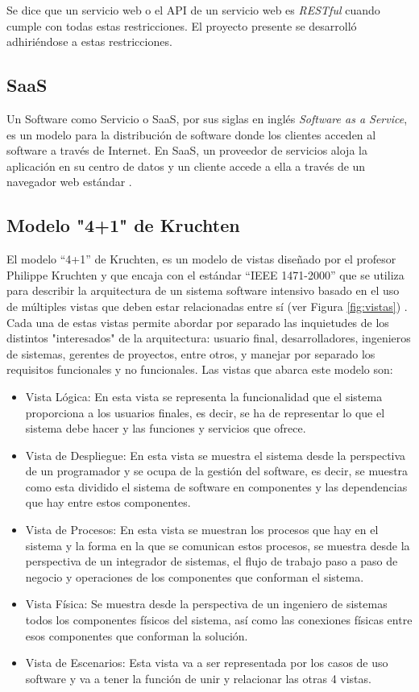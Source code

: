 Se dice que un servicio web o el API de un servicio web es \textit{RESTful} cuando cumple con todas estas restricciones. El proyecto presente se desarrolló adhiriéndose a estas restricciones.

\subsection{SaaS}

Un Software como Servicio o SaaS, por sus siglas en inglés \textit{Software as a Service}, es un modelo para la distribución de software donde los clientes acceden al software a través de Internet. En SaaS, un proveedor de servicios aloja la aplicación en su centro de datos y un cliente accede a ella a través de un navegador web estándar \cite{saas}.

\subsection{Modelo "4+1" de Kruchten}

El modelo “4+1” de Kruchten, es un modelo de vistas diseñado por el profesor Philippe Kruchten y que encaja con el estándar “IEEE 1471-2000” que se utiliza para describir la arquitectura de un sistema software intensivo basado en el uso de múltiples vistas que deben estar relacionadas entre sí (ver Figura \ref{fig:vistas}) \cite{vistasKruchten}. Cada una de estas vistas permite abordar por separado las inquietudes de los distintos "interesados" de la arquitectura: usuario final, desarrolladores, ingenieros de sistemas, gerentes de proyectos, entre otros, y manejar por separado los requisitos funcionales y no funcionales. Las vistas que abarca este modelo son:
\begin{itemize}
	\item Vista Lógica: En esta vista se representa la funcionalidad que el sistema proporciona a los usuarios finales, es decir, se ha de representar lo que el sistema debe hacer y las funciones y servicios que ofrece.
	\item Vista de Despliegue: En esta vista se muestra el sistema desde la perspectiva de un programador y se ocupa de la gestión del software, es decir, se muestra como esta dividido el sistema de software en componentes y las dependencias que hay entre estos componentes.
 	\item Vista de Procesos: En esta vista se muestran los procesos que hay en el sistema y la forma en la que se comunican estos procesos, se muestra desde la perspectiva de un integrador de sistemas, el flujo de trabajo paso a paso de negocio y operaciones de los componentes que conforman el sistema.
	\item Vista Física: Se muestra desde la perspectiva de un ingeniero de sistemas todos los componentes físicos del sistema, así como las conexiones físicas entre esos componentes que conforman la solución.
	\item Vista de Escenarios: Esta vista va a ser representada por los casos de uso  software y va a tener la función de unir y relacionar las otras 4 vistas.
\end{itemize}

